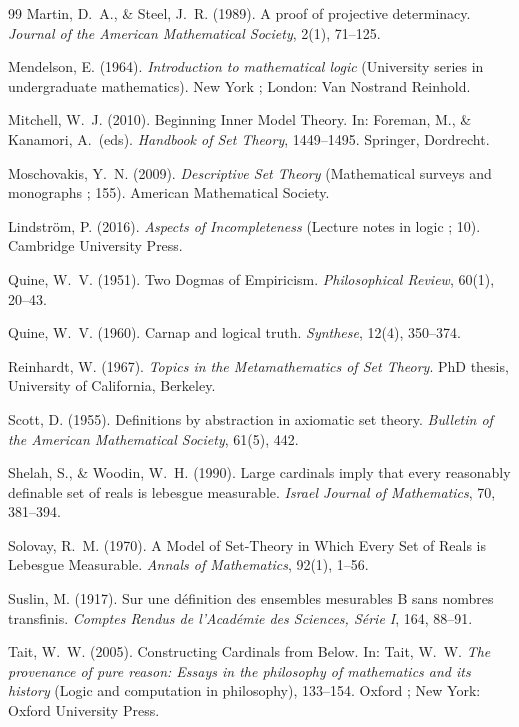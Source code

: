 \documentclass[12pt]{article}
\theoremstyle{plain}
\theoremstyle{definition}
\begin{document}
\begin{thebibliography}{99}
	 Martin, D.\ A., \& Steel, J.\ R. (1989). A proof of projective determinacy. \textit{Journal of the American Mathematical Society}, 2(1), 71--125.

	 Mendelson, E. (1964). \textit{Introduction to mathematical logic} (University series in undergraduate mathematics). New York ; London: Van Nostrand Reinhold.

	 Mitchell, W.\ J. (2010). Beginning Inner Model Theory. In: Foreman, M., \& Kanamori, A.\ (eds). \textit{Handbook of Set Theory}, 1449--1495. Springer, Dordrecht.

	 Moschovakis, Y.\ N. (2009). \textit{Descriptive Set Theory} (Mathematical surveys and monographs ; 155). American Mathematical Society.

	 Lindstr\"om, P. (2016). \textit{Aspects of Incompleteness} (Lecture notes in logic ; 10). Cambridge University Press.

	 Quine, W.\ V. (1951). Two Dogmas of Empiricism. \textit{Philosophical Review}, 60(1), 20--43.

	 Quine, W.\ V. (1960). Carnap and logical truth. \textit{Synthese}, 12(4), 350--374.

	 Reinhardt, W. (1967). \textit{Topics in the Metamathematics of Set Theory}. PhD thesis, University of California, Berkeley.

	 Scott, D. (1955). Definitions by abstraction in axiomatic set theory. \textit{Bulletin of the American Mathematical Society}, 61(5), 442.

	 Shelah, S., \& Woodin, W.\ H. (1990). Large cardinals imply that every reasonably definable set of reals is lebesgue measurable. \textit{Israel Journal of Mathematics}, 70, 381--394.

	 Solovay, R.\ M. (1970). A Model of Set-Theory in Which Every Set of Reals is Lebesgue Measurable. \textit{Annals of Mathematics}, 92(1), 1--56.

	 Suslin, M. (1917). Sur une d\'efinition des ensembles mesurables B sans nombres transfinis. \textit{Comptes Rendus de l'Acad\'emie des Sciences, S\'erie I}, 164, 88--91.

	 Tait, W.\ W. (2005). Constructing Cardinals from Below. In: Tait, W.\ W. \textit{The provenance of pure reason: Essays in the philosophy of mathematics and its history} (Logic and computation in philosophy), 133--154. Oxford ; New York: Oxford University Press.


\end{thebibliography}
\end{document}
